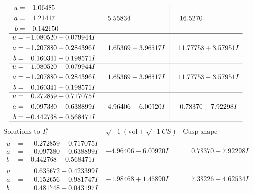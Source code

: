 \documentclass[1p]{elsarticle_modified}
\theoremstyle{definition}
\newcommand{\I}{\sqrt{-1}}
\begin{document}
$$\begin{array}{c|c|c}
\begin{aligned}
u &= \phantom{-}1.06485\phantom{ +0.000000I} \\
a &= \phantom{-}1.21417\phantom{ +0.000000I} \\
b &= -0.142650\phantom{ +0.000000I}\end{aligned}
 & \phantom{-}5.55834\phantom{ +0.000000I} & \phantom{-}16.5270\phantom{ +0.000000I} \\ \hline\begin{aligned}
u &= -1.080520 + 0.079944 I \\
a &= -1.207880 + 0.284396 I \\
b &= \phantom{-}0.160341 - 0.198571 I\end{aligned}
 & \phantom{-}1.65369 - 3.96617 I & \phantom{-}11.77753 + 3.57951 I \\ \hline\begin{aligned}
u &= -1.080520 - 0.079944 I \\
a &= -1.207880 - 0.284396 I \\
b &= \phantom{-}0.160341 + 0.198571 I\end{aligned}
 & \phantom{-}1.65369 + 3.96617 I & \phantom{-}11.77753 - 3.57951 I \\ \hline\begin{aligned}
u &= \phantom{-}0.272859 + 0.717075 I \\
a &= \phantom{-}0.097380 + 0.638899 I \\
b &= -0.442768 - 0.568471 I\end{aligned}
 & -4.96406 + 6.00920 I & \phantom{-}0.78370 - 7.92298 I\\
 \hline 
 \end{array}$$\newpage$$\begin{array}{c|c|c}  
\text{Solutions to }I^u_{1}& \I (\text{vol} + \sqrt{-1}CS) & \text{Cusp shape}\\
 \hline 
\begin{aligned}
u &= \phantom{-}0.272859 - 0.717075 I \\
a &= \phantom{-}0.097380 - 0.638899 I \\
b &= -0.442768 + 0.568471 I\end{aligned}
 & -4.96406 - 6.00920 I & \phantom{-}0.78370 + 7.92298 I \\ \hline\begin{aligned}
u &= \phantom{-}0.635672 + 0.423399 I \\
a &= \phantom{-}0.152656 + 0.981747 I \\
b &= \phantom{-}0.481748 - 0.043197 I\end{aligned}
 & -1.98468 + 1.46890 I & \phantom{-}7.38226 - 4.62534 I \\ \hline\begin{aligned}

\end{aligned}
\end{array}$$
\end{document}
